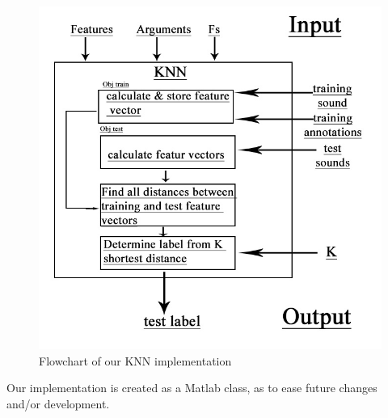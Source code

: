 \begin{figure}[h]
	\begin{center}
	\includegraphics[scale=0.5]{fig/diagram2.jpg}
	\caption{Flowchart of our KNN implementation}
	\label{KNN:flow}
	\end{center}
\end{figure}

Our implementation is created as a Matlab class, as to ease future changes and/or development. 
